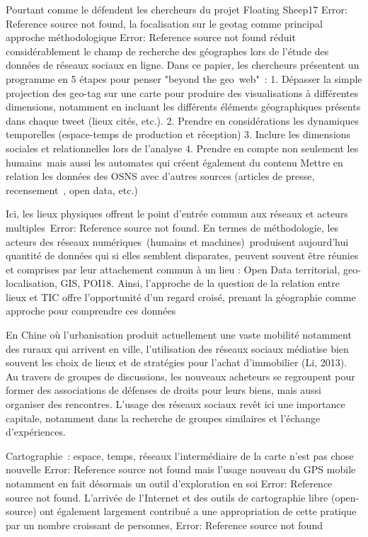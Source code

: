 Pourtant comme le défendent les chercheurs du projet Floating Sheep17 Error: Reference source not found, la focalisation sur le geotag comme principal approche méthodologique Error: Reference source not found réduit considérablement le champ de recherche des géographes lors de l’étude des données de réseaux sociaux en ligne. Dans ce papier, les chercheurs présentent un programme en 5 étapes pour penser "beyond the geo web" :
1. Dépasser la simple projection des geo-tag sur une carte pour produire des visualisations à différentes dimensions, notamment en incluant les différents éléments géographiques présents dans chaque tweet (lieux cités, etc.).
2. Prendre en considérations les dynamiques temporelles (espace-temps de production et réception)
3. Inclure les dimensions sociales et relationnelles lors de l’analyse
4. Prendre en compte non seulement les humains mais aussi les automates qui créent également du contenu
Mettre en relation les données des OSNS avec d’autres sources (articles de presse, recensement , open data, etc.)

Ici, les lieux physiques offrent le point d'entrée commun aux réseaux et acteurs multiples Error: Reference source not found. En termes de méthodologie, les acteurs des réseaux numériques (humains et machines) produisent aujourd'hui quantité de données qui si elles semblent disparates, peuvent souvent être réunies et comprises par leur attachement commun à un lieu : Open Data territorial, geo-localisation, GIS, POI18.  Ainsi, l’approche de la question de la relation entre lieux et TIC offre l’opportunité d’un regard croisé, prenant la géographie comme approche pour comprendre ces données

En Chine où l'urbanisation produit actuellement une vaste mobilité notamment des ruraux qui arrivent en ville, l'utilisation des réseaux sociaux médiatise bien souvent les choix de lieux et de stratégies pour l’achat d’immobilier (Li, 2013). Au travers de groupes de discussions, les nouveaux acheteurs se regroupent pour former des associations de défenses de droits pour leurs biens, mais aussi organiser des rencontres. L’usage des réseaux sociaux revêt ici une importance capitale, notamment dans la recherche de groupes similaires et l’échange d’expériences.

Cartographie : espace, temps, réseaux
l’intermédiaire de la carte n’est pas chose nouvelle Error: Reference source not found mais l’usage nouveau du GPS mobile notamment en fait désormais un outil d’exploration en soi Error: Reference source not found. L’arrivée de l’Internet et des outils de cartographie libre (open-source) ont également largement contribué a une appropriation de cette pratique par un nombre croissant de personnes, Error: Reference source not found

